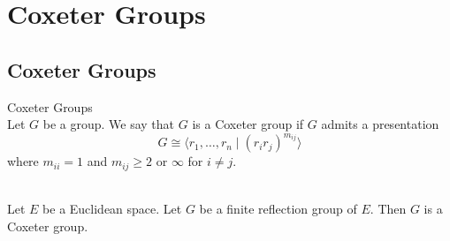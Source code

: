 \documentclass[a4paper]{article}
\begin{document}
\pagebreak
\section{Coxeter Groups}
\subsection{Coxeter Groups}
\begin{defn}{Coxeter Groups}{}\\
Let $G$ be a group. We say that $G$ is a Coxeter group if $G$ admits a presentation $$G\cong\langle r_1,\dots,r_n\;|\;(r_ir_j)^{m_{ij}}\rangle$$ where $m_{ii}=1$ and $m_{ij}\geq 2$ or $\infty$ for $i\neq j$. 
\end{defn}

\begin{prp}{}{}\\
Let $E$ be a Euclidean space. Let $G$ be a finite reflection group of $E$. Then $G$ is a Coxeter group. 
\end{prp}
\end{document}
